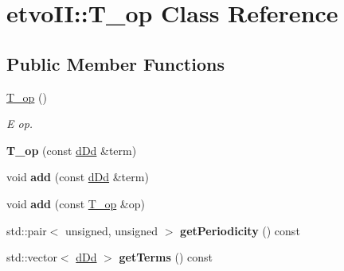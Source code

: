 \hypertarget{classetvo_i_i_1_1_t__op}{}\section{etvo\+II\+:\+:T\+\_\+op Class Reference}
\label{classetvo_i_i_1_1_t__op}
\subsection*{Public Member Functions}
\begin{DoxyCompactItemize}
\item 
\mbox{\label{classetvo_i_i_1_1_t__op_a8381627b92222fe5fa7c3ad4e07bc7e8}} 
\mbox{\hyperlink{classetvo_i_i_1_1_t__op_a8381627b92222fe5fa7c3ad4e07bc7e8}{T\+\_\+op}} ()
\begin{DoxyCompactList}\small\item\em E op. \end{DoxyCompactList}\item 
\mbox{\label{classetvo_i_i_1_1_t__op_afa7715276693e1d5105335a660f72291}} 
{\bfseries T\+\_\+op} (const \mbox{\hyperlink{classetvo_i_i_1_1d_dd}{d\+Dd}} \&term)
\item 
\mbox{\label{classetvo_i_i_1_1_t__op_a9acc9d283812511eb94af19e114e2c40}} 
void {\bfseries add} (const \mbox{\hyperlink{classetvo_i_i_1_1d_dd}{d\+Dd}} \&term)
\item 
\mbox{\label{classetvo_i_i_1_1_t__op_aaf851da3708d18f38e034c0453c1153f}} 
void {\bfseries add} (const \mbox{\hyperlink{classetvo_i_i_1_1_t__op}{T\+\_\+op}} \&op)
\item 
\mbox{\label{classetvo_i_i_1_1_t__op_a33b2270ebe289302866b4da5a08ad751}} 
std\+::pair$<$ unsigned, unsigned $>$ {\bfseries get\+Periodicity} () const
\item 
\mbox{\label{classetvo_i_i_1_1_t__op_ab6692ede8f4210c4f136be21fc0b23aa}} 
std\+::vector$<$ \mbox{\hyperlink{classetvo_i_i_1_1d_dd}{d\+Dd}} $>$ {\bfseries get\+Terms} () const
\item 
\mbox{\label{classetvo_i_i_1_1_t__op_a4993c538d84002b8f96cc69c7004e0bc}} 

\end{DoxyCompactItemize}
